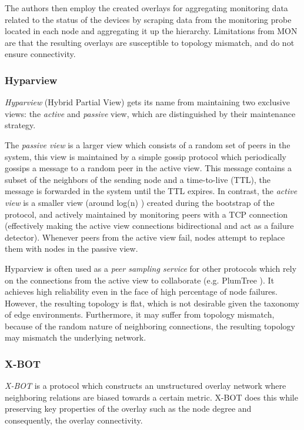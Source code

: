 The authors then employ the created overlays for aggregating monitoring data related to the status of the devices by scraping data from the monitoring probe located in each node and aggregating it up the hierarchy. Limitations from MON are that the resulting overlays are susceptible to topology mismatch, and do not ensure connectivity.

\subsubsection*{Hyparview}

\textit{Hyparview} \cite{Hyparview} (Hybrid Partial View) gets its name from maintaining two exclusive views: the \textit{active} and \textit{passive} view, which are distinguished by their maintenance strategy. 

The \textit{passive view} is a larger view which consists of a random set of peers in the system, this view is maintained by a simple gossip protocol which periodically gossips a message to a random peer in the active view. This message contains a subset of the neighbors of the sending node and a time-to-live (TTL), the message is forwarded in the system until the TTL expires. In contrast, the \textit{active view} is a smaller view (around log(n) ) created during the bootstrap of the protocol, and actively maintained by monitoring peers with a TCP connection (effectively making the active view connections bidirectional and act as a failure detector). Whenever peers from the active view fail, nodes attempt to replace them with nodes in the passive view.

Hyparview is often used as a \textit{peer sampling service} for other protocols which rely on the connections from the active view to collaborate (e.g. PlumTree \cite{leitao2007epidemic}). It achieves high reliability even in the face of high percentage of node failures. However, the resulting topology is flat, which is not desirable given the taxonomy of edge environments. Furthermore, it may suffer from topology mismatch, because of the random nature of neighboring connections, the resulting topology may mismatch the underlying network.

\subsubsection*{X-BOT}

\textit{X-BOT} \cite{leitao2012x} is a protocol which constructs an unstructured overlay network where neighboring relations are biased towards a certain metric. X-BOT does this while preserving key properties of the overlay such as the node degree and consequently, the overlay connectivity.

